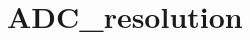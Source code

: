\hypertarget{group___a_d_c__resolution}{\section{A\-D\-C\-\_\-resolution}
\label{group___a_d_c__resolution}
}
